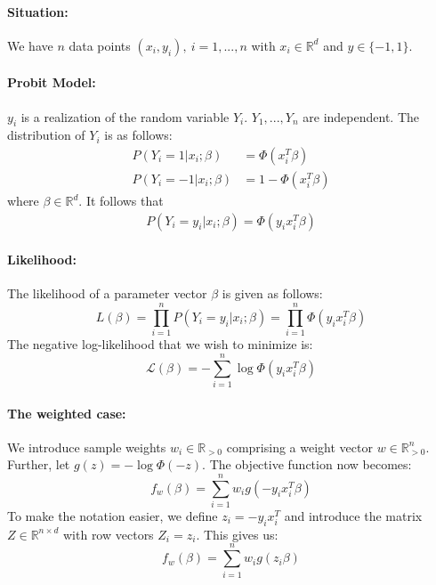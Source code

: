 \paragraph{Situation:}
We have $n$ data points $(x_i, y_i), \ i=1,...,n$ with
$x_i \in \mathbb{R}^d$ and $y \in \{ -1, 1\}$.

\paragraph{Probit Model:}
$y_i$ is a realization of the random variable $Y_i$.
$Y_1, ..., Y_n$ are independent.
The distribution of $Y_i$ is as follows:
\begin{align*}
    P(Y_i = 1 | x_i; \beta)  & = \Phi(x_i^T \beta)     \\
    P(Y_i = -1 | x_i; \beta) & = 1 - \Phi(x_i^T \beta)
\end{align*}
where $\beta \in \mathbb{R}^d$.
It follows that
\begin{align*}
    P(Y_i = y_i | x_i; \beta) = \Phi(y_i x_i^T \beta)
\end{align*}

\paragraph{Likelihood:}
The likelihood of a parameter vector $\beta$ is given as follows:
\begin{equation*}
    L(\beta) = \prod_{i=1}^n P(Y_i = y_i | x_i; \beta) = \prod_{i=1}^n \Phi(y_i x_i^T \beta)
\end{equation*}
The negative log-likelihood that we wish to minimize is:
\begin{equation*}
    \mathcal{L}(\beta) = -\sum_{i=1}^n \log \Phi(y_i x_i^T \beta)
\end{equation*}

\paragraph{The weighted case:}
We introduce sample weights $w_i \in \mathbb{R}_{>0}$
comprising a weight vector $w \in \mathbb{R}_{>0}^n$.
Further, let $g(z) = -\log \Phi(-z)$.
The objective function now becomes:
\begin{equation*}
    f_w(\beta) = \sum_{i=1}^n w_i g(-y_i x_i^T \beta)
\end{equation*}
To make the notation easier, we define $z_i = -y_i x_i^T$ and introduce
the matrix $Z \in \mathbb{R}^{n \times d}$ with row vectors $Z_i = z_i$.
This gives us:
\begin{equation*}
    f_w(\beta) = \sum_{i=1}^n w_i g(z_i \beta)
\end{equation*}

